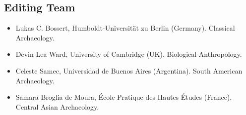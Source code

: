 \begin{footnotesize}
\section*{Editing Team}
\begin{itemize}
		\setlength{\itemsep}{0pt}%
		\setlength{\parskip}{0pt}%
		\setlength{\parsep}{0pt}%
\item Lukas C. Bossert, Humboldt-Universität zu Berlin (Germany). Classical Archaeology.
\item Devin Lea Ward, University of Cambridge (UK). Biological Anthropology.
\item Celeste Samec, Universidad de Buenos Aires (Argentina). South American Archaeology.
\item Samara Broglia de Moura, École Pratique des Hautes Études (France). Central Asian Archaeology.

\end{itemize}

\end{footnotesize}
